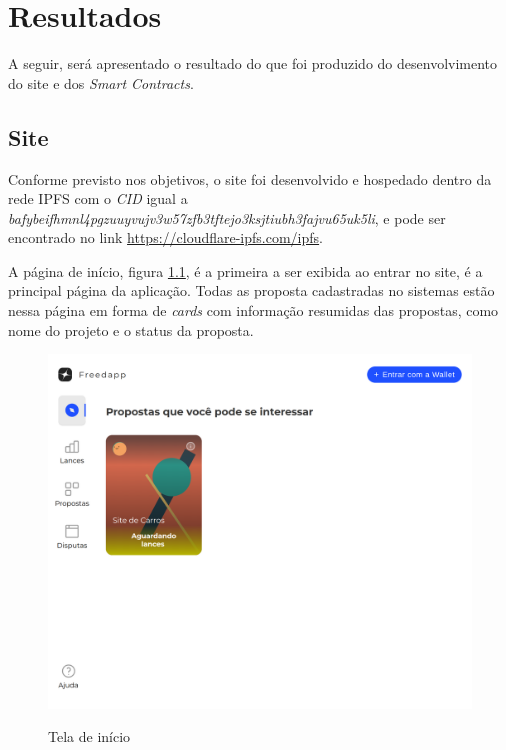 \chapter{Resultados}

A seguir, será apresentado o resultado do que foi produzido do desenvolvimento do site e dos \textit{Smart Contracts}.

\section{Site}


Conforme previsto nos objetivos, o site foi desenvolvido e hospedado dentro da rede IPFS com o \textit{CID} igual a \textit{bafybeifhmnl4pgzuuyvujv3w57zfb3tftejo3ksjtiubh3fajvu65uk5li}, e pode ser encontrado no link \href{https://cloudflare-ipfs.com/ipfs/bafybeifhmnl4pgzuuyvujv3w57zfb3tftejo3ksjtiubh3fajvu65uk5li/}{https://cloudflare-ipfs.com/ipfs}.

A página de início, figura \ref{fig:home_page_fig}, é a primeira a ser exibida ao entrar no site, é a principal página da aplicação. Todas as proposta cadastradas no sistemas estão nessa página em forma de \textit{cards} com informação resumidas das propostas, como nome do projeto e o status da proposta.

\begin{figure}[h!]
  \centering
  \caption{Tela de início}
  \includegraphics[width=450px]{src/images/app/home_page.png}
  \label{fig:home_page_fig}
\end{figure}

